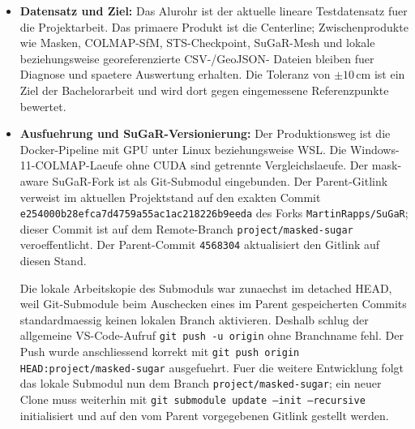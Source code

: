 \documentclass[12pt,a4paper]{article}
\begin{document}
\begin{itemize}
    \item \textbf{Datensatz und Ziel:} Das Alurohr ist der aktuelle lineare
          Testdatensatz fuer die Projektarbeit. Das primaere Produkt ist die
          Centerline; Zwischenprodukte wie Masken, COLMAP-SfM, STS-Checkpoint,
          SuGaR-Mesh und lokale beziehungsweise georeferenzierte CSV-/GeoJSON-
          Dateien bleiben fuer Diagnose und spaetere Auswertung erhalten. Die
          Toleranz von $\pm 10\,\mathrm{cm}$ ist ein Ziel der Bachelorarbeit
          und wird dort gegen eingemessene Referenzpunkte bewertet.
        \item \textbf{Ausfuehrung und SuGaR-Versionierung:} Der Produktionsweg ist
            die Docker-Pipeline mit GPU unter Linux beziehungsweise WSL. Die
            Windows-11-COLMAP-Laeufe ohne CUDA sind getrennte Vergleichslaeufe.
            Der mask-aware SuGaR-Fork ist als Git-Submodul eingebunden. Der
            Parent-Gitlink verweist im aktuellen Projektstand auf den exakten
            Commit \texttt{e254000b28efca7d4759a55ac1ac218226b9eeda} des Forks
            \texttt{MartinRapps/SuGaR}; dieser Commit ist auf dem Remote-Branch
            \texttt{project/masked-sugar} veroeffentlicht. Der Parent-Commit
            \texttt{4568304} aktualisiert den Gitlink auf
            diesen Stand.

            Die lokale Arbeitskopie des Submoduls war zunaechst im detached HEAD,
            weil Git-Submodule beim Auschecken eines im Parent gespeicherten
            Commits standardmaessig keinen lokalen Branch aktivieren. Deshalb
            schlug der allgemeine VS-Code-Aufruf \texttt{git push -u origin}
            ohne Branchname fehl. Der Push wurde anschliessend korrekt mit
            \texttt{git push origin HEAD:project/masked-sugar} ausgefuehrt.
            Fuer die weitere Entwicklung folgt das lokale Submodul nun dem
            Branch \texttt{project/masked-sugar}; ein neuer Clone muss weiterhin
            mit \texttt{git submodule update --init --recursive} initialisiert
            und auf den vom Parent vorgegebenen Gitlink gestellt werden.


\end{itemize}
\end{document}
